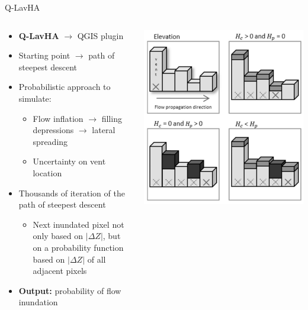 \documentclass[10pt,aspectratio=169]{beamer}
\begin{document}
\begin{frame}{Q-LavHA}
    \begin{columns}[T]
      \begin{column}{0.5\textwidth}	
        \begin{itemize}
          \item<1- | alert@1> \textbf{Q-LavHA} $\rightarrow$ QGIS plugin
          \item<1- | alert@1> Starting point $\rightarrow$ path of steepest descent
          \item<2- | alert@2> Probabilistic approach to simulate:
          \begin{itemize}
            \item Flow \alert{inflation} $\rightarrow$ \alert{filling} depressions $\rightarrow$ lateral \alert{spreading}
            \item Uncertainty on \alert{vent location}
          \end{itemize}
          \item<3- | alert@3> \alert{Thousands} of iteration of the path of steepest descent
          \begin{itemize}
            \item Next inundated pixel not only based on $\vert \Delta Z\vert $, but on a probability function based on $\vert \Delta Z\vert $ of all adjacent pixels
          \end{itemize}
          \item<4- | alert@4> \textbf{Output:} probability of flow inundation

        \end{itemize}
      \end{column}

      \begin{column}{0.5\textwidth}	
        \centering\includegraphics[width=1\textwidth]{img/qlavha_pixels.png}
      \end{column}


\end{columns}
\end{frame}
\end{document}
